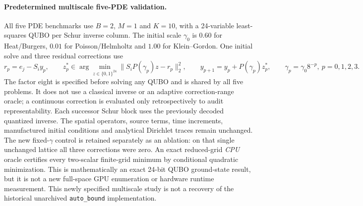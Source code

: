 
\paragraph{Predetermined multiscale five-PDE validation.}
All five PDE benchmarks use $B=2$, $M=1$ and $K=10$, with a 24-variable
least-squares QUBO per Schur inverse column. The initial scale $\gamma_0$
is $0.60$ for Heat/Burgers, $0.01$ for Poisson/Helmholtz and $1.00$
for Klein--Gordon. One initial solve and three residual corrections use
\begin{equation}
  r_p=e_j-S_i y_p,\qquad
  z_p^*\in\arg\min_{z\in\{0,1\}^{24}}\|S_i P(\gamma_p)z-r_p\|_2^2,\qquad
  y_{p+1}=y_p+P(\gamma_p)z_p^*,\qquad
  \gamma_p=\gamma_0 8^{-p},\ p=0,1,2,3.
  \label{eq:five_pde_multiscale}
\end{equation}
The factor eight is specified before solving any QUBO and is shared by all five
problems. It does not use a classical inverse or an adaptive correction-range
oracle; a continuous correction is evaluated only retrospectively to audit
representability. Each successor Schur block uses the previously decoded
quantized inverse. The spatial operators, source terms, time increments,
manufactured initial conditions and analytical Dirichlet traces remain
unchanged. The new fixed-$\gamma$ control is retained separately as an
ablation: on that single unchanged lattice all three corrections were zero.
An exact reduced-grid \emph{CPU} oracle certifies every two-scalar finite-grid
minimum by conditional quadratic minimization. This is mathematically
an exact 24-bit QUBO ground-state result, but it is not a new full-space
GPU enumeration or hardware runtime measurement. This newly specified
multiscale study is not a recovery of the historical unarchived
\texttt{auto\_bound} implementation.

